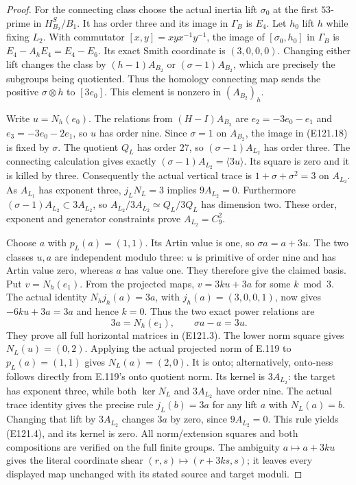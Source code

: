 \begin{proof}
For the connecting class choose the actual inertia lift
$\sigma_0$ at the first $53$-prime in $H^S_{B_2}/B_1$.
It has order three and its image in $\Gamma_B$ is $E_4$.
Let $h_0$ lift $h$ while fixing $L_2$. With commutator
$[x,y]=xyx^{-1}y^{-1}$, the image of
$[\sigma_0,h_0]$ in $\Gamma_B$ is
$E_4-A_hE_4=E_4-E_6$.
Its exact Smith coordinate is $(3,0,0,0)$.
Changing either lift changes the class by $(h-1)A_{B_2}$
or $(\sigma-1)A_{B_2}$, which are precisely the subgroups
being quotiented. Thus the homology connecting map sends
the positive $\sigma\otimes h$ to $[3e_0]$.
This element is nonzero in $(A_{B_2})_h$.

Write $u=N_h(e_0)$. The relations from $(H-I)A_{B_2}$ are
$e_2=-3e_0-e_1$ and $e_3=-3e_0-2e_1$, so $u$ has order
nine. Since $\sigma=1$ on $A_{B_2}$, the image in
(E121.18) is fixed by $\sigma$. The quotient $Q_L$ has order
$27$, so $(\sigma-1)A_{L_2}$ has order three.
The connecting calculation gives exactly
$(\sigma-1)A_{L_2}=\langle3u\rangle$.
Its square is zero and it is killed by three.
Consequently the actual vertical trace is
$1+\sigma+\sigma^2=3$ on $A_{L_2}$.
As $A_{L_1}$ has exponent three, $j_LN_L=3$ implies
$9A_{L_2}=0$.
Furthermore $(\sigma-1)A_{L_2}\subset3A_{L_2}$, so
$A_{L_2}/3A_{L_2}\simeq Q_L/3Q_L$ has dimension two.
These order, exponent and generator constraints prove
$A_{L_2}=C_9^2$.

Choose $a$ with $p_L(a)=(1,1)$. Its Artin value is one,
so $\sigma a=a+3u$. The two classes $u,a$ are independent
modulo three: $u$ is primitive of order nine and has Artin
value zero, whereas $a$ has value one. They therefore give
the claimed basis. Put $v=N_h(e_1)$. From the projected
maps, $v=3ku+3a$ for some $k\bmod3$.
The actual identity $N_hj_h(a)=3a$, with
$j_h(a)=(3,0,0,1)$, now gives
$-6ku+3a=3a$ and hence $k=0$.
Thus the two exact power relations are
\[
 3a=N_h(e_1),\qquad
 \sigma a-a=3u.
 \tag{E121.19}
\]
They prove all full horizontal matrices in (E121.3).
The lower norm square gives $N_L(u)=(0,2)$.
Applying the actual projected norm of E.119 to
$p_L(a)=(1,1)$ gives $N_L(a)=(2,0)$.
It is onto; alternatively, onto-ness follows directly from
E.119's onto quotient norm. Its kernel is $3A_{L_2}$:
the target has exponent three, while both $\ker N_L$ and
$3A_{L_2}$ have order nine.
The actual trace identity gives the precise rule
$j_L(b)=3a$ for any lift $a$ with $N_L(a)=b$.
Changing that lift by $3A_{L_2}$ changes $3a$ by zero,
since $9A_{L_2}=0$. This rule yields (E121.4), and its
kernel is zero. All norm/extension squares and both
compositions are verified on the full finite groups.
The ambiguity $a\mapsto a+3ku$ gives the literal coordinate
shear $(r,s)\mapsto(r+3ks,s)$; it leaves every displayed
map unchanged with its stated source and target moduli.


\end{proof}
